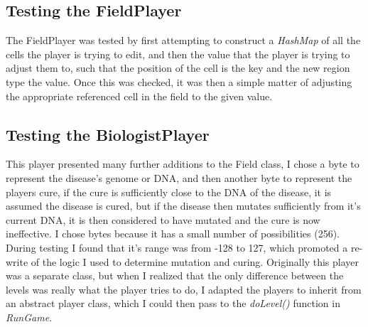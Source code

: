 \documentclass[pdftex,12pt,a4paper]{article}
\begin{document}
		\subsection{Testing the FieldPlayer}
			The FieldPlayer was tested by first attempting to construct a \emph{HashMap} of all the cells the player is trying to edit, and then the value that the player is trying to adjust them to, such that the position of the cell is the key and the new region type the value. Once this was checked, it was then a simple matter of adjusting the appropriate referenced cell in the field to the given value. 
		\subsection{Testing the BiologistPlayer}
			This player presented many further additions to the Field class, I chose a byte to represent the disease's genome or DNA, and then another byte to represent the players cure, if the cure is sufficiently close to the DNA of the disease, it is assumed the disease is cured, but if the disease then mutates sufficiently from it's current DNA, it is then considered to have mutated and the cure is now ineffective. I chose bytes because it has a small number of possibilities (256). During testing I found that it's range was from -128 to 127, which promoted a re-write of the logic I used to determine mutation and curing. Originally this player was a separate class, but when I realized that the only difference between the levels was really what the player tries to do, I adapted the players to inherit from an abstract player class, which I could then pass to the \emph{doLevel()} function in \emph{RunGame}. 
	\newpage
\end{document}
